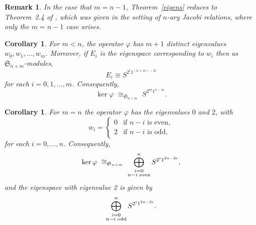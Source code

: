\documentclass[12pt]{amsart}
\numberwithin{equation}{section}
\newcommand{\be}{\begin{equation}}
\newcommand{\ee}{\end{equation}}
\def\sg{\mathfrak S}
\newtheorem{corollary}[theorem]{Corollary}
\newtheorem{rem}[theorem]{Remark}
\begin{document}
 \begin{rem} In the case that $m=n-1$, Theorem~\ref{eigens} reduces to Theorem~2.4 of \cite{FHSW2}, which was given in the setting  of $n$-ary Jacobi relations, where only the $m=n-1$ case arises.     
\end{rem} 
  

\begin{corollary} \label{eigencor1}
For $m<n$, the operator $\varphi$ has $m+1$ distinct eigenvalues $w_0, w_1,\dots,w_m$.
Moreover, if $E_i$ is the eigenspace corresponding to $w _i$ then as $\sg_{n+m}$-modules,
$$E_i\cong S^{2^i1^{(n+m)-2i}}$$
for each $i=0,1, \ldots , m$. Consequently, 
\begin{equation} \label{nulleq} \ker \varphi \,\, \cong_{\sg_{n+m}}\,\, S^{2^m1^{n-m}}.
\end{equation}
\end{corollary}

\begin{corollary} \label{eigencor2}
 For $m=n$ the operator $\varphi$ has the eigenvalues $0$ and $2$, with
$$ w_i= 
\begin{cases} 
0 & \text{if } n-i \text{ is even}, \\
2& \text{if } n-i \text{ is odd},
\end{cases}
$$
for each $i=0, \ldots , n$. Consequently, 
\be \label{d=n} \ker \varphi \,\, \cong_{\sg_{n+m}}  \,\, \bigoplus^n_
{\begin{subarray}{c} i=0 \\ n-i \text{ even} \end{subarray}} S^{2^i1^{2n-2i}},
\ee
and the eigenspace with eigenvalue 2 is given by
\[  \bigoplus^n_
{\begin{subarray}{c} i=0 \\ n-i \text{ odd} \end{subarray}} S^{2^i1^{2n-2i}}.
\]
\end{corollary}
\end{document}
